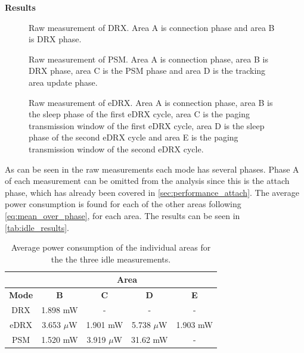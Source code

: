 \textbf{Results}\\
\begin{minipage}{0.48\textwidth}
\begin{figure}[H]
\centering
\resizebox{\textwidth}{!}{
}
\caption{Raw measurement of \gls{DRX}. Area A is connection phase and area B is DRX phase.}
\label{fig:DRX}
\end{figure}
\vspace{0.8em}
\end{minipage}%
\hfill
\begin{minipage}{0.48\textwidth}
\begin{figure}[H]
\centering
\resizebox{\textwidth}{!}{
}
\caption{Raw measurement of \gls{PSM}. Area A is connection phase, area B is DRX phase, area C is the PSM phase and area D is the tracking area update phase.}
\label{fig:PSM}
\end{figure}
\end{minipage}
\vspace{1em}
\begin{figure}[H]
\centering
\begin{minipage}{0.48\textwidth}
\resizebox{\textwidth}{!}{
}
\caption{Raw measurement of \gls{eDRX}. Area A is connection phase, area B is the sleep phase of the first eDRX cycle, area C is the paging transmission window of the first eDRX cycle, area D is the sleep phase of the second eDRX cycle and area E is the paging transmission window of the second eDRX cycle.}
\label{fig:eDRX1}
\end{minipage}
\end{figure}

As can be seen in the raw measurements each mode has several phases. Phase A of each measurement can be omitted from the analysis since this is the attach phase, which has already been covered in \autoref{sec:performance_attach}. The average power consumption is found for each of the other areas following \autoref{eq:mean_over_phase}, for each area. The results can be seen in \autoref{tab:idle_results}.

\begin{table}[H]
\centering
\begin{tabular}{|c|c|c|c|c|} 
\multicolumn{1}{c}{ }	& \multicolumn{4}{c}{Area} \\ \hline
\textbf{Mode}	& \textbf{B}	& \textbf{C} 	& \textbf{D} 	& \textbf{E} \\ \hline
DRX				& 1.898 mW		& - 			& - 			& - \\ \hline
eDRX			& 3.653 $\mu$W	& 1.901 mW		& 5.738 $\mu$W	& 1.903 mW \\ \hline
PSM 			& 1.520 mW		& 3.919 $\mu$W	& 31.62 mW		& - \\ \hline 
\end{tabular}
\caption{Average power consumption of the individual areas for the the three idle measurements.}
\label{tab:idle_results}
\end{table}

